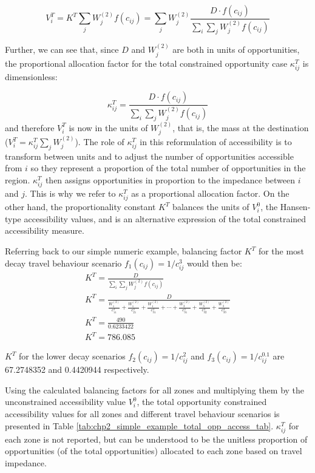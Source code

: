 \documentclass[
11pt, %
oneside, %
english, %
singlespacing, %
]{macthesis} %
\begin{document}
\[
V^T_i = K^T\sum_j W^{(2)}_jf(c_{ij}) = \sum_j W^{(2)}_j\frac{D\cdot f(c_{ij})}{\sum_i\sum_j W^{(2)}_jf(c_{ij})}
\]

Further, we can see that, since \(D\) and \(W^{(2)}_j\) are both in units of opportunities, the proportional allocation factor for the total constrained opportunity case \(\kappa_{ij}^T\) is dimensionless:

\[
\kappa_{ij}^T = \frac{D\cdot f(c_{ij})}{\sum_i\sum_j W^{(2)}_jf(c_{ij})}
\]
\noindent and therefore \(V^T_i\) is now in the units of \(W^{(2)}_j\), that is, the mass at the destination (\(V^T_i = \kappa_{ij}^T\sum_j W^{(2)}_j\)). The role of \(\kappa_{ij}^T\) in this reformulation of accessibility is to transform between units and to adjust the number of opportunities accessible from \(i\) so they represent a proportion of the total number of opportunities in the region. \(\kappa_{ij}^T\) then assigns opportunities in proportion to the impedance between \(i\) and \(j\). This is why we refer to \(\kappa_{ij}^T\) as a proportional allocation factor. On the other hand, the proportionality constant \(K^T\) balances the units of \(V^0_i\), the Hansen-type accessibility values, and is an alternative expression of the total constrained accessibility measure.

Referring back to our simple numeric example, balancing factor \(K^T\) for the most decay travel behaviour scenario \(f_1(c_{ij}) = 1/c_{ij}^3\) would then be:
\[
\begin{array}{l}
K^T = \frac{D}{\sum_{i}\sum_{j} W_j^{(2)} f(c_{ij})}\\
K^T = \frac{D}{\frac{W_1^{(2)}}{c_{11}^3}+\frac{W_1^{(2)}}{c_{21}^3} + \frac{W_1^{(2)}}{c_{31}^3} + \cdots + \frac{W_3^{(2)}}{c_{31}^3} + \frac{W_3^{(2)}}{c_{32}^3} + \frac{W_3^{(2)}}{c_{33}^3}
}\\
K^T = \frac{490}{0.6233422} \\
K^T = 786.085
\end{array}
\]

\(K^T\) for the lower decay scenarios \(f_2(c_{ij}) = 1/c_{ij}^2\) and \(f_3(c_{ij}) = 1/c_{ij}^0.1\) are 67.2748352 and 0.4420944 respectively.

Using the calculated balancing factors for all zones and multiplying them by the unconstrained accessibility value \(V^0_i\), the total opportunity constrained accessibility values for all zones and different travel behaviour scenarios is presented in Table \ref{tab:chp2_simple_example_total_opp_access_tab}. \(\kappa_{ij}^T\) for each zone is not reported, but can be understood to be the unitless proportion of opportunities (of the total opportunities) allocated to each zone based on travel impedance.
\end{document}
